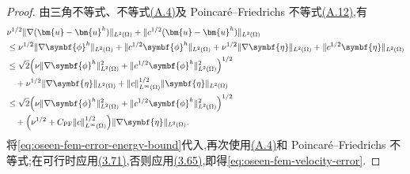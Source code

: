 \begin{proof}
由三角不等式、不等式\hyperref[eq:appendix-a-4]{(A.4)}及 Poincaré--Friedrichs 不等式\hyperref[eq:appendix-a-12]{(A.12)},有
\[
\begin{aligned}
  &\nu^{1/2}\|\nabla(\bm{u}-\bm{u}^h)\|_{L^2(\Omega)}
       +\|c^{1/2}(\bm{u}-\bm{u}^h)\|_{L^2(\Omega)}\\
  &\le \nu^{1/2}\|\nabla\symbf{\phi}^h\|_{L^2(\Omega)}
       +\|c^{1/2}\symbf{\phi}^h\|_{L^2(\Omega)}
       +\nu^{1/2}\|\nabla\symbf{\eta}\|_{L^2(\Omega)}
       +\|c^{1/2}\symbf{\eta}\|_{L^2(\Omega)}\\
  &\le \sqrt{2}\Bigl(
       \nu\|\nabla\symbf{\phi}^h\|_{L^2(\Omega)}^2
       +\|c^{1/2}\symbf{\phi}^h\|_{L^2(\Omega)}^2
       \Bigr)^{1/2}\\
   &\quad+\nu^{1/2}\|\nabla\symbf{\eta}\|_{L^2(\Omega)}
        +\|c\|_{L^\infty(\Omega)}^{1/2}
           \|\symbf{\eta}\|_{L^2(\Omega)}\\
  &\le \sqrt{2}\Bigl(
       \nu\|\nabla\symbf{\phi}^h\|_{L^2(\Omega)}^2
       +\|c^{1/2}\symbf{\phi}^h\|_{L^2(\Omega)}^2
        \Bigr)^{1/2}\\
   &\quad+\Bigl(\nu^{1/2}
           +C_{\mathrm{PF}}\|c\|_{L^\infty(\Omega)}^{1/2}\Bigr)
           \|\nabla\symbf{\eta}\|_{L^2(\Omega)} .
\end{aligned}
\]
将\cref{eq:oseen-fem-error-energy-bound}代入,再次使用\hyperref[eq:appendix-a-4]{(A.4)}和 Poincaré--Friedrichs 不等式;在可行时应用\hyperref[eq:best-approximation-preserving-interpolant]{(3.71)},否则应用\hyperref[eq:best-approximation-vdiv-bound]{(3.65)},即得\cref{eq:oseen-fem-velocity-error}.
\end{proof}

